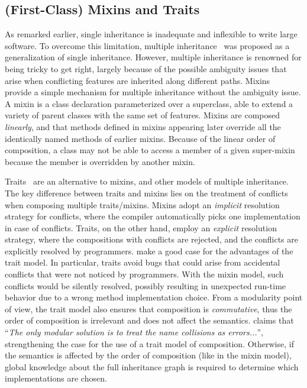 \subsection{(First-Class) Mixins and Traits}

As remarked earlier, single inheritance is inadequate and inflexible to write
large software. To overcome this limitation, multiple
inheritance~\citep{cardelli1984semantics} was proposed as a generalization of
single inheritance. However, multiple inheritance is renowned for being tricky
to get right, largely because of the possible ambiguity issues that arise when
conflicting features are inherited along different paths.
Mixins~\citep{bracha1990mixin} provide a simple mechanism for multiple
inheritance without the ambiguity issue. A mixin is a class declaration
parameterized over a superclass, able to extend a variety of parent classes with
the same set of features. Mixins are composed \emph{linearly}, and that methods defined
in mixins appearing later override all the identically named methods of earlier
mixins. Because of the linear order of composition, a class may not be able
to access a member of a given super-mixin because the member is overridden by
another mixin.

Traits~\citep{scharli2003traits, Ducasse_2006} are an alternative to mixins, and
other models of multiple inheritance. The key difference between traits and
mixins lies on the treatment of conflicts when composing multiple traits/mixins.
Mixins adopt an \emph{implicit} resolution strategy for conflicts, where the
compiler automatically picks one implementation in case of conflicts. Traits, on
the other hand, employ an \emph{explicit} resolution strategy, where the
compositions with conflicts are rejected, and the conflicts are explicitly
resolved by programmers. \citet{scharli2003traits} make a good case for the
advantages of the trait model. In particular, traits avoid bugs that could arise
from accidental conflicts that were not noticed by programmers. With the mixin
model, such conflicts would be silently resolved, possibly resulting in
unexpected run-time behavior due to a wrong method implementation choice. From a
modularity point of view, the trait model also ensures that composition is
\emph{commutative}, thus the order of composition is irrelevant and does not
affect the semantics. \citet{bracha1992programming} claims that ``\emph{The only
  modular solution is to treat the name collisions as errors...}'',
strengthening the case for the use of a trait model of composition. Otherwise,
if the semantics is affected by the order of composition (like in the mixin model), global knowledge about
the full inheritance graph is required to determine which implementations are
chosen.

